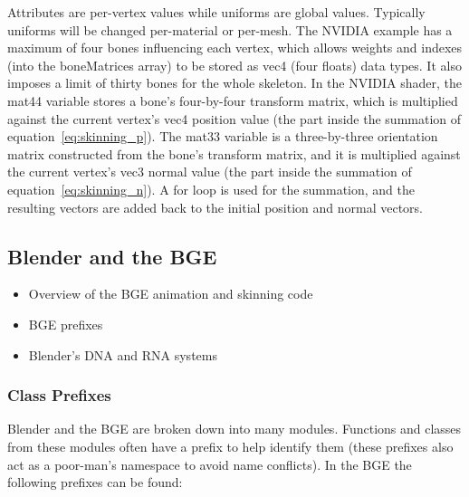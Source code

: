 Attributes are per-vertex values while uniforms are global values.
Typically uniforms will be changed per-material or per-mesh.
The NVIDIA example has a maximum of four bones influencing each vertex, which allows weights and indexes (into the boneMatrices array) to be stored as vec4 (four floats) data types.
It also imposes a limit of thirty bones for the whole skeleton.
In the NVIDIA shader, the mat44 variable stores a bone's four-by-four transform matrix, which is multiplied against the current vertex's vec4 position value (the part inside the summation of equation~\ref{eq:skinning_p}).
The mat33 variable is a three-by-three orientation matrix constructed from the bone's transform matrix, and it is multiplied against the current vertex's vec3 normal value (the part inside the summation of equation~\ref{eq:skinning_n}).
A for loop is used for the summation, and the resulting vectors are added back to the initial position and normal vectors.

\subsection{Blender and the BGE}
\ifsummaries
\begin{itemize}
 \item Overview of the BGE animation and skinning code
 \item BGE prefixes
 \item Blender's DNA and RNA systems
\end{itemize}
\fi

\subsubsection{Class Prefixes}
Blender and the BGE are broken down into many modules.
Functions and classes from these modules often have a prefix to help identify them (these prefixes also act as a poor-man's namespace to avoid name conflicts).
In the BGE the following prefixes can be found:

